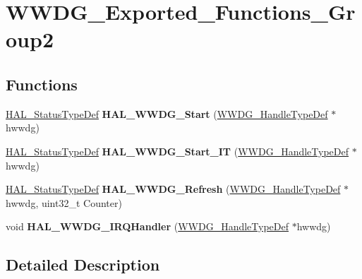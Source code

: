 \hypertarget{group___w_w_d_g___exported___functions___group2}{}\section{W\+W\+D\+G\+\_\+\+Exported\+\_\+\+Functions\+\_\+\+Group2}
\label{group___w_w_d_g___exported___functions___group2}
\subsection*{Functions}
\begin{DoxyCompactItemize}
\item 
\hyperlink{stm32f4xx__hal__def_8h_a63c0679d1cb8b8c684fbb0632743478f}{H\+A\+L\+\_\+\+Status\+Type\+Def} {\bfseries H\+A\+L\+\_\+\+W\+W\+D\+G\+\_\+\+Start} (\hyperlink{struct_w_w_d_g___handle_type_def}{W\+W\+D\+G\+\_\+\+Handle\+Type\+Def} $\ast$hwwdg)\hypertarget{group___w_w_d_g___exported___functions___group2_ga6d56ddea267609ae162392f725c22ffc}{}\label{group___w_w_d_g___exported___functions___group2_ga6d56ddea267609ae162392f725c22ffc}

\item 
\hyperlink{stm32f4xx__hal__def_8h_a63c0679d1cb8b8c684fbb0632743478f}{H\+A\+L\+\_\+\+Status\+Type\+Def} {\bfseries H\+A\+L\+\_\+\+W\+W\+D\+G\+\_\+\+Start\+\_\+\+IT} (\hyperlink{struct_w_w_d_g___handle_type_def}{W\+W\+D\+G\+\_\+\+Handle\+Type\+Def} $\ast$hwwdg)\hypertarget{group___w_w_d_g___exported___functions___group2_ga67ae975315e3bf0ff2252b2cd32686ef}{}\label{group___w_w_d_g___exported___functions___group2_ga67ae975315e3bf0ff2252b2cd32686ef}

\item 
\hyperlink{stm32f4xx__hal__def_8h_a63c0679d1cb8b8c684fbb0632743478f}{H\+A\+L\+\_\+\+Status\+Type\+Def} {\bfseries H\+A\+L\+\_\+\+W\+W\+D\+G\+\_\+\+Refresh} (\hyperlink{struct_w_w_d_g___handle_type_def}{W\+W\+D\+G\+\_\+\+Handle\+Type\+Def} $\ast$hwwdg, uint32\+\_\+t Counter)\hypertarget{group___w_w_d_g___exported___functions___group2_ga33c30c69b966b353572a2d36a702efc3}{}\label{group___w_w_d_g___exported___functions___group2_ga33c30c69b966b353572a2d36a702efc3}

\item 
void {\bfseries H\+A\+L\+\_\+\+W\+W\+D\+G\+\_\+\+I\+R\+Q\+Handler} (\hyperlink{struct_w_w_d_g___handle_type_def}{W\+W\+D\+G\+\_\+\+Handle\+Type\+Def} $\ast$hwwdg)\hypertarget{group___w_w_d_g___exported___functions___group2_ga6521c5a0ff3184f951561302fb540fde}{}\label{group___w_w_d_g___exported___functions___group2_ga6521c5a0ff3184f951561302fb540fde}

\end{DoxyCompactItemize}


\subsection{Detailed Description}

